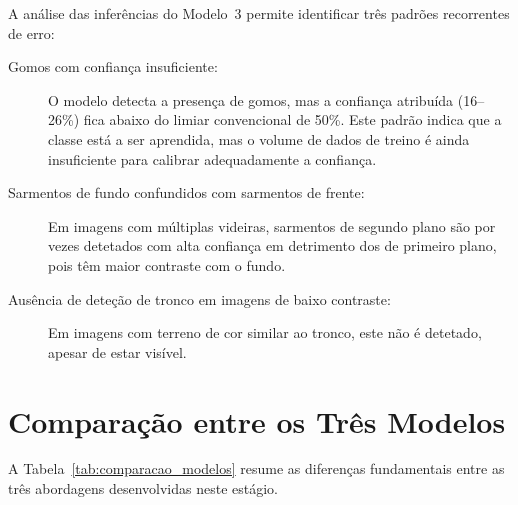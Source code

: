 A análise das inferências do Modelo~3 permite identificar três padrões
recorrentes de erro:

\begin{description}
  \item[Gomos com confiança insuficiente:] O modelo detecta a presença de
    gomos, mas a confiança atribuída (16--26\%) fica abaixo do limiar
    convencional de 50\%. Este padrão indica que a classe está a ser
    aprendida, mas o volume de dados de treino é ainda insuficiente para
    calibrar adequadamente a confiança.

  \item[Sarmentos de fundo confundidos com sarmentos de frente:]
    Em imagens com múltiplas videiras, sarmentos de segundo plano são
    por vezes detetados com alta confiança em detrimento dos de primeiro
    plano, pois têm maior contraste com o fundo.

  \item[Ausência de deteção de tronco em imagens de baixo contraste:]
    Em imagens com terreno de cor similar ao tronco, este não é detetado,
    apesar de estar visível.
\end{description}

\section{Comparação entre os Três Modelos}

A Tabela~\ref{tab:comparacao_modelos} resume as diferenças fundamentais
entre as três abordagens desenvolvidas neste estágio.

